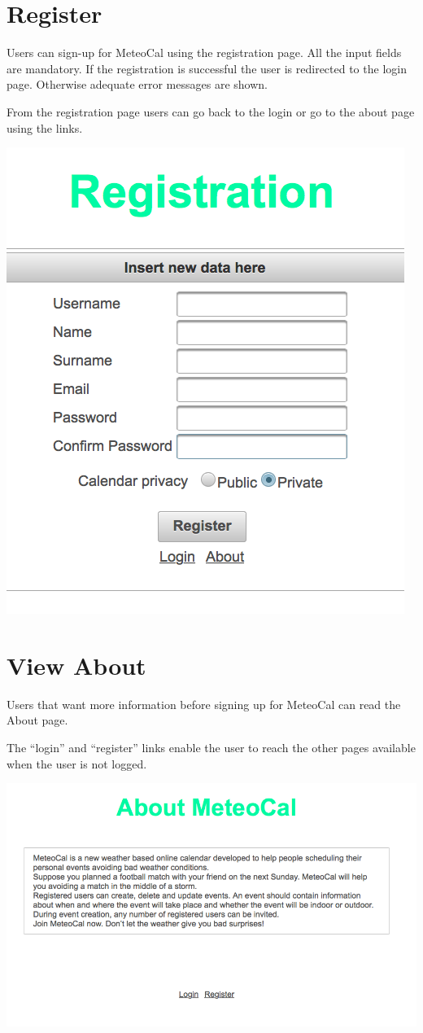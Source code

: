 \documentclass[10pt,a4paper,titlepage]{article}
\begin{document}
\section{Register}
Users can sign-up for MeteoCal using the registration page. All the input fields are mandatory. If the registration is successful the user is redirected to the login page. Otherwise adequate error messages are shown.

From the registration page users can go back to the login or go to the about page using the links.

\begin{center}
\includegraphics[width=0.7\linewidth]{./images/02_registration.png}
\end{center}

\section{View About}
Users that want more information before signing up for MeteoCal can read the About page.

The “login” and “register” links enable the user to reach the other pages available when the user is not logged.

\begin{center}
\includegraphics[width=\linewidth]{./images/03_about.png}
\end{center}
\end{document}

